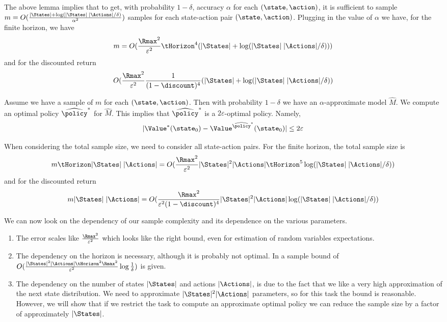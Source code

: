 The above lemma implies that to get, with probability $1-\delta$,
accuracy $\alpha$ for each $(\state,\action)$, it is sufficient to
sample $m=O(\frac{|\States| +
\log(|\States|\;|\Actions|/\delta)}{\alpha^2} )$ samples for each
state-action pair $(\state,\action)$. Plugging in the value of
$\alpha$ we have, for the finite horizon, we have
\[
m=O(\frac{\Rmax^2}{\varepsilon^2} \tHorizon^4 (|\States|+\log
(|\States|\;|\Actions|/\delta)))
\]
and for the discounted return
\[
O(\frac{\Rmax^2}{\varepsilon^2}  \frac{1}{(1-\discount)^4}
(|\States|+\log (|\States|\;|\Actions|/\delta))
\]


Assume we have a sample of $m$ for each $(\state,\action)$. Then
with probability $1-\delta$ we have an $\alpha$-approximate model
$\widehat{M}$.
%
We compute an optimal policy $\widehat{\policy}^*$ for
$\widehat{M}$.
%
This implies that $\widehat{\policy}^*$ is a $2\varepsilon$-optimal
policy. Namely,
\[
|\Value^*(\state_0)-\Value^{\widehat{\policy}^*}(\state_0)|\leq
2\varepsilon
\]


When considering the total sample size, we need to consider all
state-action pairs. For the finite horizon, the total sample size is
\[
m\tHorizon|\States|\;|\Actions|=O(\frac{\Rmax^2}{\varepsilon^2}
|\States|^2 |\Actions| \tHorizon^5 \log
(|\States|\;|\Actions|/\delta))
\]
and for the discounted return
\[
m|\States|\;|\Actions|=O(\frac{\Rmax^2}{\varepsilon^2(1-\discount)^4} |\States|^2 |\Actions|  \log(|\States|\;|\Actions|/\delta))
\]

We can now look on the dependency of our sample complexity and its
dependence on the various parameters.

\begin{enumerate}
\item
The error scales like $\frac{\Rmax^2}{\varepsilon^2}$ which looks
like the right bound, even for estimation of random variables
expectations.
\item
The dependency on the horizon is necessary, although it is probably
not optimal. In \cite{DannB15} a sample bound of
$O(\frac{|\States|^2|\Actions|\tHorizon^2\Rmax^2}{\varepsilon^2}\log\frac{1}{\delta}
)$ is given.
\item
The dependency on the number of states $|\States|$ and
actions $|\Actions|$, is due to the fact that we like a very high
approximation of the next state distribution. We need to approximate
$|\States|^2|\Actions|$ parameters, so for this task the bound is
reasonable. However, we will show that if we restrict the task to
compute an approximate optimal policy we can reduce the sample size
by a factor of approximately $|\States|$.
\end{enumerate}


